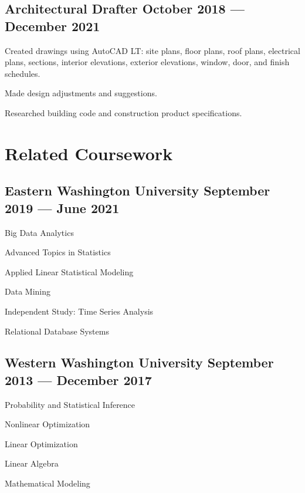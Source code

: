 \documentclass[letter,10pt]{article}
\begin{document}
\subsection{{Architectural Drafter \hfill October 2018 --- December 2021}}
\begin{zitemize}
    \item  Created drawings using AutoCAD LT: site plans, floor plans, roof plans, electrical plans, sections, interior elevations, exterior elevations, window, door, and finish schedules.
    \item Made design adjustments and suggestions.
    \item Researched building code and construction product specifications.
\end{zitemize}

\section{Related Coursework}
\subsection{{Eastern Washington University \hfill September 2019 --- June 2021}}
\begin{zitemize}
    \item Big Data Analytics
    \item Advanced Topics in Statistics
    \item Applied Linear Statistical Modeling
    \item Data Mining
    \item Independent Study: Time Series Analysis
    \item Relational Database Systems
\end{zitemize}

\subsection{{Western Washington University \hfill September 2013 --- December 2017}}
\begin{zitemize}
    \item Probability and Statistical Inference
    \item Nonlinear Optimization
    \item Linear Optimization
    \item Linear Algebra
    \item Mathematical Modeling
\end{zitemize}
\end{document}

